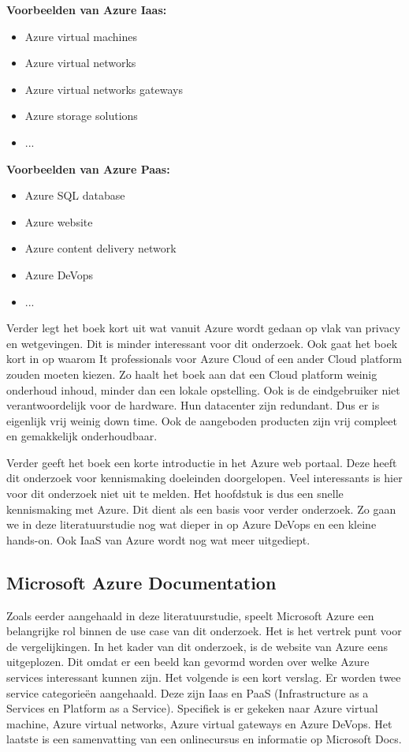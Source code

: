 \textbf{Voorbeelden van Azure Iaas:}
\begin{itemize}
    \item Azure virtual machines
    \item Azure virtual networks
    \item Azure virtual networks gateways
    \item Azure storage solutions
    \item ...
\end{itemize}
\textbf{Voorbeelden van Azure Paas:}
\begin{itemize}
    \item Azure SQL database
    \item Azure website
    \item Azure content delivery network
    \item Azure DeVops
    \item ...
\end{itemize}
Verder legt het boek  \autocite{Copeland2015} kort uit wat vanuit Azure wordt gedaan op vlak van privacy en wetgevingen. Dit is minder interessant voor dit onderzoek. Ook gaat het boek kort in op waarom It professionals voor Azure Cloud of een ander Cloud platform zouden moeten kiezen. Zo haalt het boek  \autocite{Copeland2015} aan dat een Cloud platform weinig onderhoud inhoud, minder dan een lokale opstelling. Ook is de eindgebruiker niet verantwoordelijk voor de hardware. Hun datacenter zijn redundant. Dus er is eigenlijk vrij weinig down time. Ook de aangeboden producten zijn vrij compleet en gemakkelijk onderhoudbaar.

Verder geeft het boek  \autocite{Copeland2015} een korte introductie in het Azure web portaal. Deze heeft dit onderzoek voor kennismaking doeleinden doorgelopen. Veel interessants is hier voor dit onderzoek niet uit te melden. Het hoofdstuk is dus een snelle kennismaking met Azure. Dit dient als een basis voor verder onderzoek. Zo gaan we in deze literatuurstudie nog wat dieper in op Azure DeVops en een kleine hands-on. Ook IaaS van Azure wordt nog wat meer uitgediept.

\subsection{Microsoft Azure Documentation}
Zoals eerder aangehaald in deze literatuurstudie, speelt Microsoft Azure een belangrijke rol binnen de use case van dit onderzoek. Het is het vertrek punt voor de vergelijkingen. In het kader van dit onderzoek, is de website van Azure eens uitgeplozen. Dit omdat er een beeld kan gevormd worden over welke Azure services interessant kunnen zijn. Het volgende is een kort verslag. Er worden twee service categorieën aangehaald. Deze zijn Iaas en PaaS (Infrastructure as a Services en Platform as a Service). Specifiek is er gekeken naar Azure virtual machine, Azure virtual networks, Azure virtual gateways en Azure DeVops. Het laatste is een samenvatting van een onlinecursus en informatie op Microsoft Docs.


